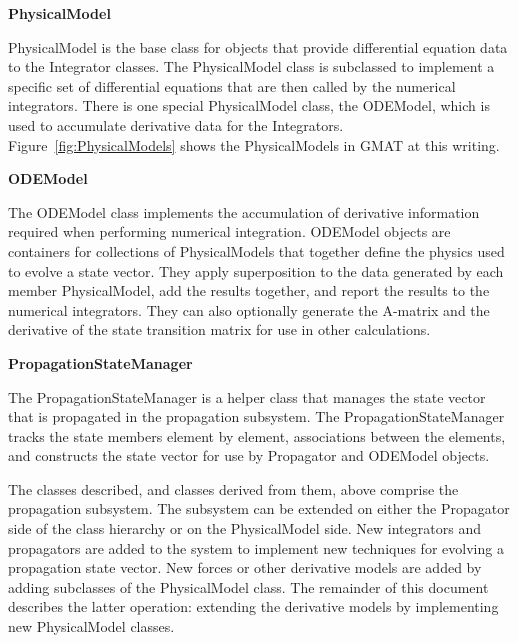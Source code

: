 \documentclass[letterpaper,10pt]{article}
\begin{document}
\begin{description}
\item \textbf{PhysicalModel}

PhysicalModel is the base class for objects that provide differential equation
data to the Integrator classes.  The PhysicalModel class is subclassed to
implement a specific set of differential equations that are then called by the
numerical integrators.  There is one special PhysicalModel class, the ODEModel,
which is used to accumulate derivative data for the Integrators. 
Figure~\ref{fig:PhysicalModels} shows the PhysicalModels in GMAT at this
writing.

\item \textbf{ODEModel}

The ODEModel class implements the accumulation of derivative information
required when performing numerical integration.  ODEModel objects are
containers for collections of PhysicalModels that together define the physics
used to evolve a state vector. They apply superposition to the data generated
by each member PhysicalModel, add the results together, and report the results
to the numerical integrators.  They can also optionally generate the A-matrix
and the derivative of the state transition matrix for use in other calculations.

\item\textbf{PropagationStateManager}

The PropagationStateManager is a helper class that manages the state vector
that is propagated in the propagation subsystem.  The PropagationStateManager
tracks the state members element by element, associations between the elements,
and constructs the state vector for use by Propagator and ODEModel objects.

\end{description}

The classes described, and classes derived from them, above comprise the
propagation subsystem.  The subsystem can be extended on either the Propagator
side of the class hierarchy or on the PhysicalModel side.  New integrators and
propagators are added to the system to implement new techniques for evolving
a propagation state vector.  New forces or other derivative models are added by
adding subclasses of the PhysicalModel class.  The remainder of this document
describes the latter operation: extending the derivative models by implementing
new PhysicalModel classes.
\end{document}
